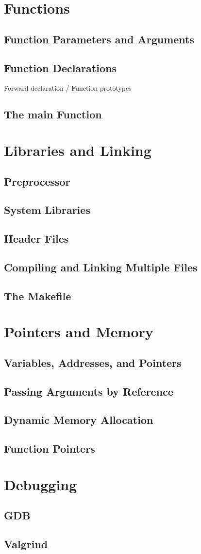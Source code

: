 \documentclass[oneside]{book}
\begin{document}
\chapter{Functions}
    \section{Function Parameters and Arguments}
    \section{Function Declarations}
    Forward declaration / Function prototypes
    \section{The main Function}

\chapter{Libraries and Linking}
    \section{Preprocessor}
    \section{System Libraries}
    \section{Header Files}
    \section{Compiling and Linking Multiple Files}
    \section{The Makefile}

\chapter{Pointers and Memory}
    \section{Variables, Addresses, and Pointers}
    \section{Passing Arguments by Reference}
    \section{Dynamic Memory Allocation}
    \section{Function Pointers}

\chapter{Debugging}
    \section{GDB}
    \section{Valgrind}
\end{document}
